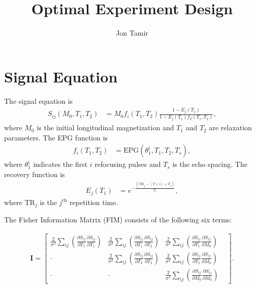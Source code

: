 \documentclass[12pt]{article}
\title{Optimal Experiment Design}
\author{Jon Tamir}
\theoremstyle{plain}
\theoremstyle{definition}
\newcommand{\nth}[1]{#1^{\mathrm{th}}}
\newcommand{\TR}{\mathrm{TR}}
\renewcommand{\vec}[1]{\mathbf{#1}}
\begin{document}
\maketitle


\section{Signal Equation}
The signal equation is
\begin{align}
  S_{ij}\left(M_0, T_1, T_2\right) &= M_0 f_i(T_1, T_2) \frac{1 - E_j(T_1)}{1 - E_j(T_1)f_T(T_1,T_2)},
  \label{eqn:signaleq}
\end{align}
where $M_0$ is the initial longitudinal magnetization and $T_1$ and $T_2$ are relaxation parameters.
The EPG function is
\begin{align}
  f_i(T_1, T_2) &= \mathrm{EPG}\left( \theta_1^i, T_1, T_2, T_s \right),
  \label{eqn:epgfun}
\end{align}
where $\theta_1^i$ indicates the first $i$ refocusing pulses and $T_s$ is the echo spacing. The recovery function is
\begin{align}
  E_j(T_1) &= e^{-\frac{(\TR_j - (T+1)\times T_s)}{T_1}},
  \label{eqn:recoveryfun}
\end{align}
where $\TR_j$ is the $\nth{j}$ repetition time.

The Fisher Information Matrix (FIM) consists of the following six terms:

\begin{align}
  \vec{I} = \begin{bmatrix}
  \frac{2}{\sigma^2} \sum_{ij}\left( \frac{\partial S_{ij}}{\partial T_1} \frac{\partial S_{ij}}{\partial T_1} \right) & 
  \frac{2}{\sigma^2} \sum_{ij}\left( \frac{\partial S_{ij}}{\partial T_1} \frac{\partial S_{ij}}{\partial T_2} \right) &
  \frac{2}{\sigma^2} \sum_{ij}\left(\frac{\partial S_{ij}}{\partial T_1} \frac{\partial S_{ij}}{\partial M_0} \right) \\
  \cdot & \frac{2}{\sigma^2} \sum_{ij}\left( \frac{\partial S_{ij}}{\partial T_2} \frac{\partial S_{ij}}{\partial T_2} \right) &
  \frac{2}{\sigma^2} \sum_{ij}\left( \frac{\partial S_{ij}}{\partial T_2} \frac{\partial S_{ij}}{\partial M_0} \right) \\
  \cdot & \cdot &
  \frac{2}{\sigma^2}\sum_{ij}\left(\frac{\partial S_{ij}}{\partial M_0} \frac{\partial S_{ij}}{\partial M_0} \right) &
\end{bmatrix}.
  \label{eqn:FIM}
\end{align}
\end{document}

